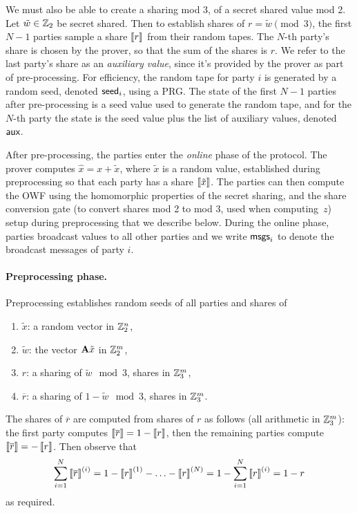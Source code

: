 We must also be able to create a sharing mod 3, of a secret shared value mod 2.
Let $\tilde{w}\in\mathbb{Z}_2$ be secret shared.  Then to establish shares of $r = \tilde{w} \pmod
3$, the first $N-1$ parties sample a share $\left\llbracket r \right\rrbracket$ from their random tapes. The
$N$-th party's share is chosen by the prover, so that the sum of the shares is
$r$.  We refer to the last party's share as an \emph{auxiliary value}, since
it's provided by the prover as part of pre-processing.  For efficiency, the random
tape for  party $i$ is
generated by a random seed, denoted $\textsf{seed}_i$, using a PRG. The state of the first
$N-1$ parties after pre-processing is a seed value used to generate the random
tape, and for the $N$-th party the state is the seed value plus the list of
auxiliary values, denoted $\textsf{aux}$. 

After pre-processing, the parties enter the \emph{online} phase of the protocol. 
The prover computes $\hat{x}= x + \tilde{x}$, where $\tilde{x}$ is a random value, established during
preprocessing so that each party has a share $\left\llbracket \tilde{x} \right\rrbracket$. 
The parties can then compute the OWF using the homomorphic properties of the secret sharing, 
and the share conversion gate (to convert shares mod 2 to mod 3, used when computing~$z$)
setup during preprocessing that we describe below. 
During the online phase, parties broadcast values to all other parties and we write $\textsf{msgs}_i$
to denote the broadcast messages of party $i$. 


\paragraph{Preprocessing phase.} Preprocessing establishes random seeds of all parties and shares of 
\begin{enumerate}
\item $\tilde{x}$: a random vector in $\mathbb{Z}_2^{n}$,
\item $\tilde{w}$: the vector $\mathbf{A} \tilde{x}$ in $\mathbb{Z}_2^{m}$, 
\item $r$: a sharing of $\tilde{w} \mod 3$, shares in $\mathbb{Z}_3^m$,  
\item $\overline{r}$: a sharing of $1-\tilde{w} \mod 3$, shares in $\mathbb{Z}_3^m$. 
\end{enumerate}
The shares of $\overline{r}$ are computed from shares of $r$ as follows (all arithmetic in $\mathbb{Z}_3^m$): the first
party computes $\left\llbracket \overline{r} \right\rrbracket = 1 - \left\llbracket r \right\rrbracket$, then the remaining parties compute
$\left\llbracket \overline{r} \right\rrbracket = - \left\llbracket r \right\rrbracket$.  Then observe that 
\[\sum_{i=1}^N \left\llbracket \overline{r} \right\rrbracket^{(i)} = 1 - \left\llbracket r \right\rrbracket^{(1)} - \ldots - \left\llbracket r \right\rrbracket^{(N)} = 1 - \sum_{i=1}^{N} \left\llbracket r \right\rrbracket^{(i)} = 1-r \]
 as required. 

